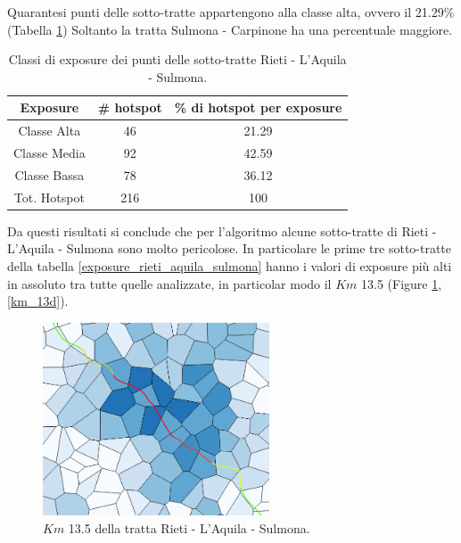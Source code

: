Quarantesi punti delle sotto-tratte appartengono alla classe alta, ovvero il 21.29\% (Tabella \ref{risultati_rieti_aquila_sulmona}) Soltanto la tratta Sulmona - Carpinone ha una percentuale maggiore. 

\begin{table}[H]
	\centering
	\begin{tabular}{|c|c|c|}
		\hline
		\rowcolor[HTML]{C0C0C0} 
		\textbf{Exposure} & \textbf{\# hotspot} & \textbf{\% di hotspot per exposure} \\ \hline
		Classe Alta       & 46                  & 21.29                                   \\ \hline
		Classe Media      & 92                 & 42.59                         \\ \hline
		Classe Bassa      & 78              & 36.12                            \\ \hline
		Tot. Hotspot      & 216               & 100                                 \\ \hline
	\end{tabular}
	\caption{Classi di exposure dei punti delle sotto-tratte Rieti - L'Aquila - Sulmona.}
	\label{risultati_rieti_aquila_sulmona}
\end{table}
Da questi risultati si conclude che per l'algoritmo alcune sotto-tratte di Rieti - L'Aquila - Sulmona sono molto pericolose.
In particolare le prime tre sotto-tratte della tabella \ref{exposure_rieti_aquila_sulmona} hanno i valori di exposure più alti in assoluto tra tutte quelle analizzate, in particolar modo il $Km$ 13.5 (Figure \ref{km_13}, \ref{km_13d}). 

\begin{figure}[h]
	\centering
	\includegraphics[width=0.6\textwidth]{images/rietizoom}
	\caption{$Km$ 13.5 della tratta Rieti - L'Aquila - Sulmona.}
	\label{km_13}
\end{figure}

